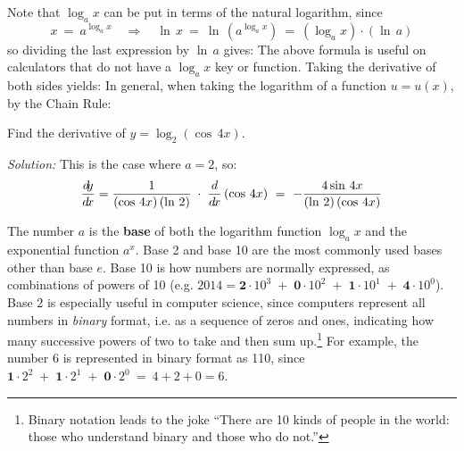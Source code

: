 Note that $\log_a x$ can be put in terms of the natural logarithm, since
\[
x ~=~ a^{\log_a x} \quad\Rightarrow\quad \ln\,x ~=~ \ln\,\left(a^{\log_a x}\right) ~=~
      (\log_a x) \cdot (\ln\,a)
\]
so dividing the last expression by $\ln\,a$ gives:
\statecomment{\[ \log_a x ~=~ \frac{\ln\,x}{\ln\,a} \]}
The above formula is useful on calculators that do not have a $\log_a x$ key or
function. Taking the derivative of both sides yields:
\newpage
{}
In general, when taking the logarithm of a function $u = u(x)$, by the Chain Rule:

\begin{exmp}
Find the derivative of $y = \log_2 (\cos\,4x)$.\vspace{1mm}
\par\noindent\emph{Solution:} This is the case where $a = 2$, so:
\[
\frac{d\negmedspace y}{d\!x} = \frac{1}{(\cos\,4x)\,(\ln\,2)} \;\cdot\; \frac{d}{d\!x}\,(\cos\,4x)
~=~ -\frac{4 \sin\,4x}{(\ln\,2)\,(\cos\,4x)}
\]
\end{exmp}
\divider
\vspace{3mm}

The number $a$ is the \textbf{base} of both the logarithm function $\log_a x$
and the exponential function $a^x$.
Base 2 and base 10 are the most commonly used bases other than base $e$.
Base 10 is how numbers are normally expressed, as combinations of powers
of 10 (e.g. $2014 = \bm{2} \cdot 10^3 \;+\; \bm{0} \cdot 10^2 \;+\;
\bm{1} \cdot 10^1 \;+\; \bm{4} \cdot 10^0$).
Base 2 is especially useful in computer science, since computers represent
all numbers in \emph{binary} format, i.e. as a sequence of zeros and ones,
indicating how many successive powers of two to take and then sum
up.\footnote{Binary notation leads to the joke
``There are 10 kinds of people in the world: those who understand binary and
those who do not.''}
For example, the number 6 is represented in binary format as 110,
since $\bm{1} \cdot 2^2 \;+\; \bm{1} \cdot 2^1 \;+\;
\bm{0} \cdot 2^0 ~=~ 4 + 2 + 0 = 6$.\vspace{2mm}

